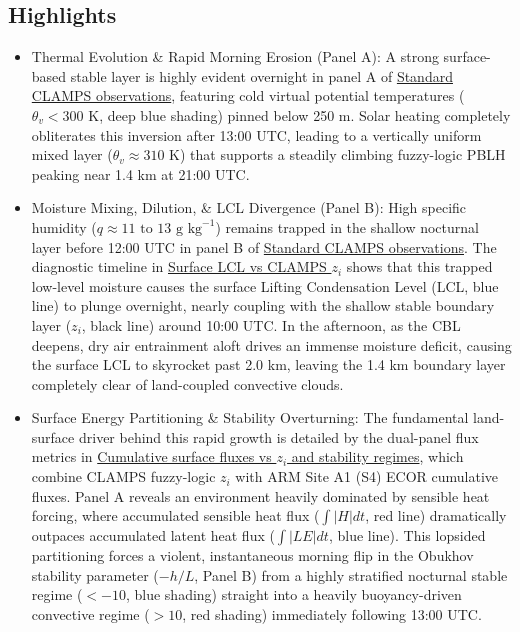 \documentclass[11pt]{article}
\begin{document}
\subsection*{Highlights}
\begin{itemize}
  \item Thermal Evolution \& Rapid Morning Erosion (Panel A): A strong surface-based stable layer is highly evident overnight in panel A of \hyperref[fig:la_interaction_c1:la_interaction_c1_instrument_template_4panel]{Standard CLAMPS observations}, featuring cold virtual potential temperatures ($\theta_v < 300\text{ K}$, deep blue shading) pinned below 250 m. Solar heating completely obliterates this inversion after 13:00 UTC, leading to a vertically uniform mixed layer ($\theta_v \approx 310\text{ K}$) that supports a steadily climbing fuzzy-logic PBLH peaking near 1.4 km at 21:00 UTC.
  \item Moisture Mixing, Dilution, \& LCL Divergence (Panel B): High specific humidity ($q \approx 11\text{ to }13\text{ g kg}^{-1}$) remains trapped in the shallow nocturnal layer before 12:00 UTC in panel B of \hyperref[fig:la_interaction_c1:la_interaction_c1_instrument_template_4panel]{Standard CLAMPS observations}. The diagnostic timeline in \hyperref[fig:la_interaction_c1:la_interaction_c1_aux_lcl_pblh_timeseries]{Surface LCL vs CLAMPS $z_i$} shows that this trapped low-level moisture causes the surface Lifting Condensation Level (LCL, blue line) to plunge overnight, nearly coupling with the shallow stable boundary layer ($z_i$, black line) around 10:00 UTC. In the afternoon, as the CBL deepens, dry air entrainment aloft drives an immense moisture deficit, causing the surface LCL to skyrocket past 2.0 km, leaving the 1.4 km boundary layer completely clear of land-coupled convective clouds.
  \item Surface Energy Partitioning \& Stability Overturning: The fundamental land-surface driver behind this rapid growth is detailed by the dual-panel flux metrics in \hyperref[fig:la_interaction_c1:la_interaction_c1_la_coupling_pblh_cumh_stability]{Cumulative surface fluxes vs $z_i$ and stability regimes}, which combine CLAMPS fuzzy-logic $z_i$ with ARM Site A1 (S4) ECOR cumulative fluxes. Panel A reveals an environment heavily dominated by sensible heat forcing, where accumulated sensible heat flux ($\int |H|dt$, red line) dramatically outpaces accumulated latent heat flux ($\int |LE|dt$, blue line). This lopsided partitioning forces a violent, instantaneous morning flip in the Obukhov stability parameter ($-h/L$, Panel B) from a highly stratified nocturnal stable regime ($<-10$, blue shading) straight into a heavily buoyancy-driven convective regime ($>10$, red shading) immediately following 13:00 UTC.

\end{itemize}
\end{document}
